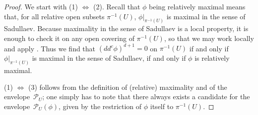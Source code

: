\documentclass[JEP,XML,SOM,Unicode,NoEqCountersInSection,published]{cedram}
\theoremstyle{definition}
\newcommand\cP{\mathcal{P}}
\newcommand\mi{^{-1}}
\begin{document}
\begin{proof}
We start with (1) $\Leftrightarrow$ (2). Recall that $\phi$ being relatively maximal means that, for all relative open subsets $\pi\mi(U)$, $\phi|_{\pi\mi(U)}$ is maximal in the sense of Sadullaev. Because maximality in the sense of Sadullaev is a local property, it is enough to check it on any open covering of $\pi\mi(U)$, so that we may work locally and apply \cite[Th.\,2.20]{complexmaeq}. Thus we find that $(dd^c\phi)^{d+1}=0$ on $\pi\mi(U)$ if and only if $\phi|_{\pi\mi(U)}$ is maximal in the sense of Sadullaev, \ie if and only if $\phi$ is relatively maximal.

(1) $\Leftrightarrow$ (3) follows from the definition of (relative) maximality and of the envelope~$\cP_U$; one simply has to note that there always exists a candidate for the envelope~$\cP_U(\phi)$, given by the restriction of $\phi$ itself to $\pi\mi(U)$.
\end{proof}
\end{document}

